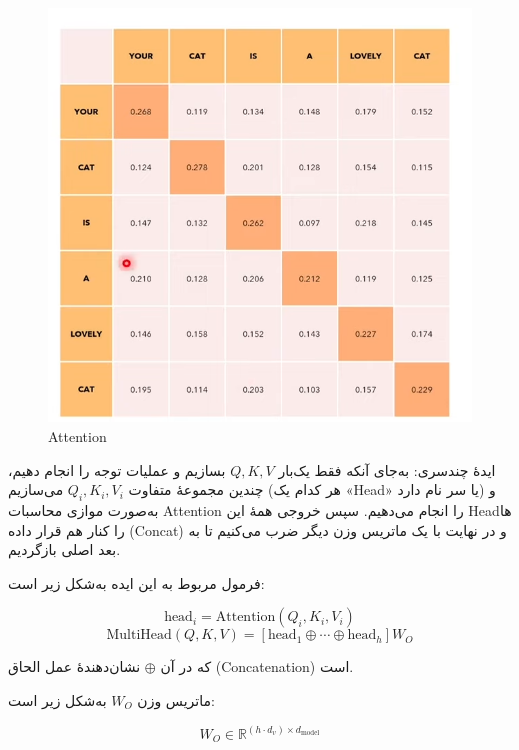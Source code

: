 \begin{figure}[h]
	\centering
	\begin{minipage}[b]{0.7\textwidth}
		\centering
		\includegraphics[width=\textwidth]{transformer_images/attention.png}
		\caption{Attention}
		\label{fig:attention}
	\end{minipage}
	\hfill
	
\end{figure}





ایدهٔ چندسری:  
به‌جای آنکه فقط یک‌بار \( Q, K, V \) بسازیم و عملیات توجه را انجام دهیم، چندین مجموعهٔ متفاوت \( Q_i, K_i, V_i \) می‌سازیم (هر کدام یک «Head» یا سر نام دارد) و به‌صورت موازی محاسبات Attention را انجام می‌دهیم. سپس خروجی همهٔ این Headها را کنار هم قرار داده (Concat) و در نهایت با یک ماتریس وزن دیگر ضرب می‌کنیم تا به بعد اصلی بازگردیم.

فرمول مربوط به این ایده به‌شکل زیر است:

\[
\text{head}_i = \text{Attention}(Q_i, K_i, V_i)
\]
\[
\text{MultiHead}(Q, K, V) = [\text{head}_1 \oplus \cdots \oplus \text{head}_h] W_O
\]

که در آن \( \oplus \) نشان‌دهندهٔ عمل الحاق (Concatenation) است.

ماتریس وزن \( W_O \) به‌شکل زیر است:

\[
W_O \in \mathbb{R}^{(h \cdot d_v) \times d_{\text{model}}}
\]

